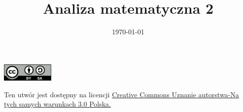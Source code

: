 \documentclass[12pt,a4paper]{article}
\theoremstyle{definition}
\begin{document}
\title{ Analiza matematyczna 2}
\date{\today}
\maketitle
\tableofcontents

\begin{center}
\leavevmode

\includegraphics[width=1in]{by-sa.png}
\end{center}
\label{fig:cc}
\scriptsize{Ten utwór jest dostępny na licencji  \href{http://creativecommons.org/licenses/by-sa/3.0/pl/}{Creative Commons Uznanie autorstwa-Na tych samych warunkach 3.0 Polska.}}


\pagebreak
\end{document}
